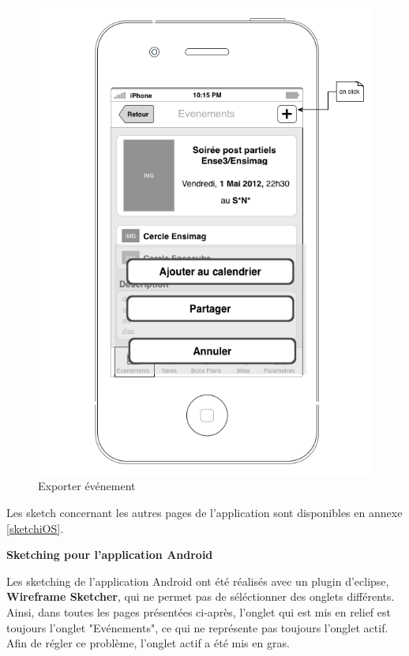 \documentclass[a4paper, 11px]{article}
\begin{document}
\begin{figure}[htbp]
\begin{minipage}[c]{.50\linewidth}
\begin{center}
			\includegraphics[scale=0.3]{../../Sketch/iOS/evenements_detail_plus.png}
		\end{center}
	\caption{Exporter événement}
	\end{minipage}
\end{figure}

Les sketch concernant les autres pages de l'application sont disponibles en annexe \ref{sketchiOS}.\\

\newpage

\textbf{Sketching pour l'application Android}

Les sketching de l'application Android ont été réalisés avec un plugin d'eclipse, \textbf{Wireframe Sketcher}, qui ne permet pas de séléctionner des onglets différents. Ainsi, dans toutes les pages présentées ci-après, l'onglet qui est mis en relief est toujours l'onglet "Evénements", ce qui ne représente pas toujours l'onglet actif. Afin de régler ce problème, l'onglet actif a été mis en gras.
\end{document}
